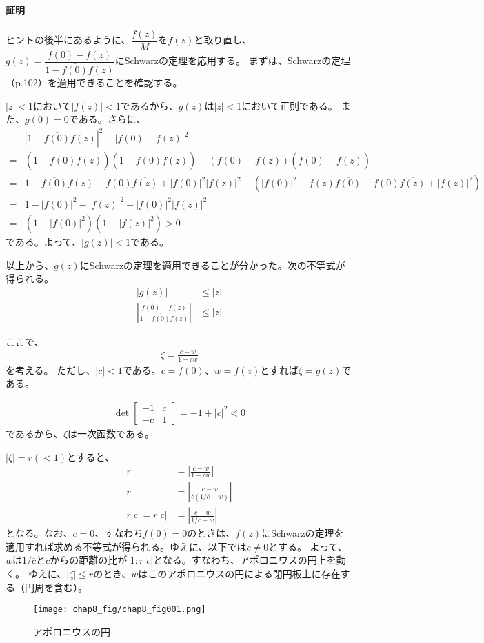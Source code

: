 \paragraph{証明}
ヒントの後半にあるように、$\dfrac{f(z)}{M}$を$f(z)$と取り直し、$g(z)=\dfrac{f(0)-f(z)}{1-\overline{f(0)}f(z)}$にSchwarzの定理を応用する。
まずは、Schwarzの定理（p.102）を適用できることを確認する。

$|z|<1$において$|f(z)|<1$であるから、$g(z)$は$|z|<1$において正則である。
また、$g(0)=0$である。さらに、
\begin{align*}
    &|1-\overline{f(0)}f(z)|^2-|f(0)-f(z)|^2\\
    =&(1-\overline{f(0)}f(z))(1-f(0)\overline{f(z)})-(f(0)-f(z))(\overline{f(0)}-\overline{f(z)})\\
    =&1-\overline{f(0)}f(z)-f(0)\overline{f(z)}+|f(0)|^2|f(z)|^2-(|f(0)|^2-f(z)\overline{f(0)}-f(0)\overline{f(z)}+|f(z)|^2)\\
    =&1-|f(0)|^2-|f(z)|^2+|f(0)|^2|f(z)|^2\\
    =&(1-|f(0)|^2)(1-|f(z)|^2)>0
\end{align*}
である。よって、$|g(z)|<1$である。

以上から、$g(z)$にSchwarzの定理を適用できることが分かった。次の不等式が得られる。
\begin{align*}
    |g(z)|&\le|z|\\
    \left|\frac{f(0)-f(z)}{1-\overline{f(0)}f(z)}\right|&\le|z|
\end{align*}

ここで、
\begin{align*}
    \zeta=\frac{c-w}{1-\overline{c}w}
\end{align*}
を考える。
ただし、$|c|<1$である。$c=f(0)$、$w=f(z)$とすれば$\zeta=g(z)$である。

\begin{align*}
    \det\begin{bmatrix}
        -1&c\\-\overline{c}&1
    \end{bmatrix}
    =-1+|c|^2<0
\end{align*}
であるから、$\zeta$は一次函数である。

$|\zeta|=r(<1)$とすると、
\begin{align*}
    r&=\left|\frac{c-w}{1-\overline{c}w}\right|\\
    r&=\left|\frac{c-w}{\overline{c}(1/\overline{c}-w)}\right|\\
    r|\overline{c}|=r|c|&=\left|\frac{c-w}{1/\overline{c}-w}\right|
\end{align*}
となる。なお、$c=0$、すなわち$f(0)=0$のときは、$f(z)$にSchwarzの定理を適用すれば求める不等式が得られる。ゆえに、以下では$c\neq0$とする。
よって、$w$は$1/\overline{c}$と$c$からの距離の比が
$1:r|c|$となる。すなわち、アポロニウスの円上を動く。
ゆえに、$|\zeta|\le r$のとき、$w$はこのアポロニウスの円による閉円板上に存在する（円周を含む）。
\begin{figure}[h]
    \centering
    \texttt{[image: chap8\_fig/chap8\_fig001.png]}
    \caption{アポロニウスの円}
    \label{fig:chap8_apo}
\end{figure}


